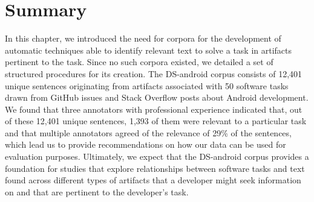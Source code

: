 
\section{Summary}
\label{cp4:corpus-summary}

In this chapter, we introduced the need for corpora 
for the development of 
automatic techniques able to identify relevant text
to solve a task in artifacts
pertinent to the task.
Since  no such corpora
existed, we detailed 
a set of structured procedures for its creation. 
The \acs{DS-android} corpus consists of  
12,401 unique sentences
originating from artifacts associated with 50 software tasks
drawn from GitHub issues and Stack Overflow posts about Android development. 
We found that 
three annotators with professional experience indicated that,
out of these 12,401 unique sentences, 
1,393 of them were relevant to a particular task and that multiple annotators agreed of the relevance of 29\% of the sentences,
which lead us to provide recommendations on how our data can be used for evaluation purposes.
Ultimately, we expect that the \acs{DS-android} corpus
provides a foundation for studies that explore relationships between software tasks and text found across different types of artifacts that a developer might seek information on and that are pertinent to the developer's task.
 
